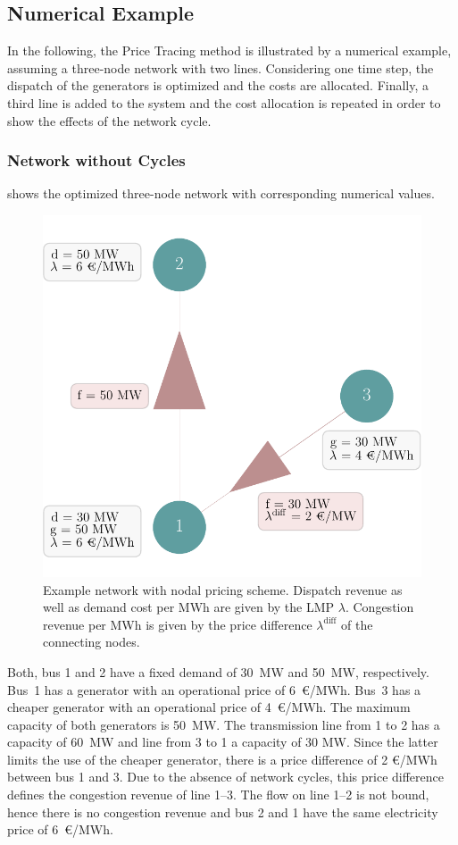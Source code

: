 \documentclass[11pt,twocolumn]{article}
\begin{document}
\subsection{Numerical Example}
\label{sec:numerical_example}

In the following, the Price Tracing method is illustrated by a numerical example, assuming a three-node network with two lines. Considering one time step, the dispatch of the generators is optimized and the costs are allocated. Finally, a third line is added to the system and the cost allocation is repeated in order to show the effects of the network cycle.

\subsubsection*{Network without Cycles}
 shows the optimized three-node network with corresponding numerical values.
\begin{figure}[h!]
    \includegraphics[width=\linewidth]{example-without-cycles/network}
    \caption{Example network with nodal pricing scheme. Dispatch revenue as well as demand cost per MWh are given by the \ac{LMP} $\lambda$. Congestion revenue per MWh is given by the price difference $\lambda^\text{diff}$ of the connecting nodes.}
    \label{fig:example-network-wo}
\end{figure}
Both, bus 1 and 2 have a fixed demand of 30~MW and 50~MW, respectively. Bus~1 has a generator with an operational price of 6~\euro/MWh. Bus~3 has a cheaper generator with an operational price of 4~\euro/MWh. The maximum capacity of both generators is 50~MW. The transmission line from 1 to 2 has a capacity of 60~MW and line from 3 to 1 a capacity of 30 MW. Since the latter limits the use of the cheaper generator, there is a price difference of 2 \euro/MWh between bus 1 and 3. Due to the absence of network cycles, this price difference defines the congestion revenue of line 1--3. The flow on line 1--2 is not bound, hence there is no congestion revenue and bus 2 and 1 have the same electricity price of 6~\euro/MWh.
\end{document}
